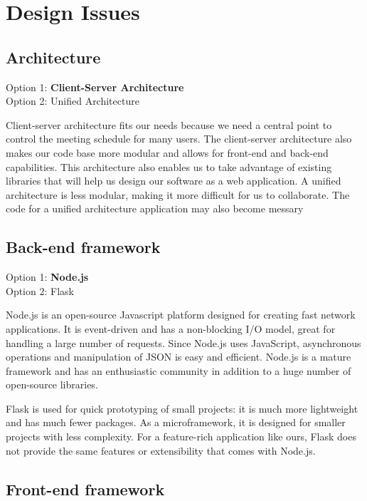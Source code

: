 \documentclass[12pt]{article}
\newcommand{\br}{\vspace{2mm}}
\begin{document}
\section{Design Issues}
\subsection*{Architecture}

\noindent
Option 1: \textbf{Client-Server Architecture} \\
Option 2: Unified Architecture

\br

Client-server architecture fits our needs because we need a central point to control the meeting schedule for many users. The client-server architecture also makes our code base more modular and allows for front-end and back-end capabilities. This architecture also enables us to take advantage of existing libraries that will help us design our software as a web application. A unified architecture is less modular, making it more difficult for us to collaborate. The code for a unified architecture application may also become messary

\newpage
\subsection*{Back-end framework}

\noindent
Option 1: \textbf{Node.js} \\
Option 2: Flask

\br

Node.js is an open-source Javascript platform designed for creating fast network applications. It is event-driven and has a non-blocking I/O model, great for handling a large number of requests. Since Node.js uses JavaScript, asynchronous operations and manipulation of JSON is easy and efficient. Node.js is a mature framework and has an enthusiastic community in addition to a huge number of open-source libraries.

Flask is used for quick prototyping of small projects: it is much more lightweight and has much fewer packages. As a microframework, it is designed for smaller projects with less complexity. For a feature-rich application like ours, Flask does not provide the same features or extensibility that comes with Node.js.

\subsection*{Front-end framework}
\end{document}

